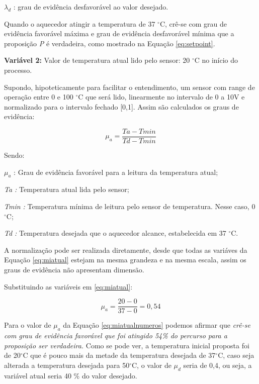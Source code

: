 $\lambda _{d}$ : grau de evidência desfavorável ao valor desejado.

Quando o aquecedor atingir a temperatura de 37 $^{\circ}$C, 
crê-se com grau de evidência favorável máxima e grau de evidência desfavorável mínima que a proposição \emph{P} é verdadeira, como mostrado na Equação \ref{eq:setpoint}.



\textbf{Variável 2:} 
Valor de temperatura atual lido pelo sensor: 20 $^{\circ}$C no início do processo.

Supondo, hipoteticamente para facilitar o entendimento, um sensor com range de operação entre 0 e 100 $^{\circ}$C que será lido, linearmente no intervalo de 0 a 10V e normalizado para o intervalo fechado [0,1]. Assim são calculados os graus de evidência:

\begin{equation}
\mu _{a} = 
\frac{Ta - Tmin}{Td - Tmin}
\label{eq:miatual}
\end{equation}

Sendo:

$\mu _{a}$ : Grau de evidência favorável para a leitura da temperatura atual;

\emph{Ta :} Temperatura atual lida pelo sensor;

\emph{Tmin :} Temperatura mínima de leitura pelo sensor de temperatura. Nesse caso, 0 $^{\circ}$C;

\emph{Td :} Temperatura desejada que o aquecedor alcance, estabelecida em 37 $^{\circ}$C.

A normalização pode ser realizada diretamente, desde que todas as variáves da Equação \ref{eq:miatual} estejam na mesma grandeza e na mesma escala, assim os graus de evidência não apresentam dimensão.

Substituindo as variáveis em \ref{eq:miatual}:

\begin{equation}
\mu _{a} = 
\frac{20 - 0}{37 - 0} = 0,54
\label{eq:miatualnumeros}
\end{equation}

Para o valor de $\mu _{a}$ da Equação \ref{eq:miatualnumeros} podemos afirmar que \emph{crê-se com grau de evidência favorável que foi atingido 54\% do percurso para a proposição ser verdadeira.} Como se pode ver, a temperatura inicial proposta foi de 20$^{\circ}$C que é pouco mais da metade da temperatura desejada de 37$^{\circ}$C, caso seja alterada a temperatura desejada para 50$^{\circ}$C, o valor de $\mu _{d}$ seria de 0,4, ou seja, a variável atual seria 40 \% do valor desejado. 

